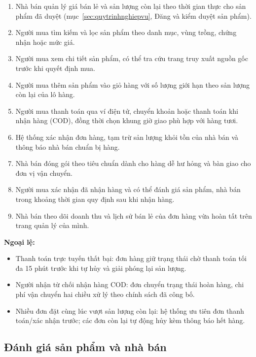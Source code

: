\begin{enumerate}
    \item Nhà bán quản lý giá bán lẻ và sản lượng còn lại theo thời gian thực cho sản phẩm đã duyệt (mục~\ref{sec:quytrinhnghiepvu}, Đăng và kiểm duyệt sản phẩm).
    \item Người mua tìm kiếm và lọc sản phẩm theo danh mục, vùng trồng, chứng nhận hoặc mức giá.
    \item Người mua xem chi tiết sản phẩm, có thể tra cứu trang truy xuất nguồn gốc trước khi quyết định mua.
    \item Người mua thêm sản phẩm vào giỏ hàng với số lượng giới hạn theo sản lượng còn lại của lô hàng.
    \item Người mua thanh toán qua ví điện tử, chuyển khoản hoặc thanh toán khi nhận hàng (COD), đồng thời chọn khung giờ giao phù hợp với hàng tươi.
    \item Hệ thống xác nhận đơn hàng, tạm trừ sản lượng khỏi tồn của nhà bán và thông báo nhà bán chuẩn bị hàng.
    \item Nhà bán đóng gói theo tiêu chuẩn dành cho hàng dễ hư hỏng và bàn giao cho đơn vị vận chuyển.
    \item Người mua xác nhận đã nhận hàng và có thể đánh giá sản phẩm, nhà bán trong khoảng thời gian quy định sau khi nhận hàng.
    \item Nhà bán theo dõi doanh thu và lịch sử bán lẻ của đơn hàng vừa hoàn tất trên trang quản lý của mình.
\end{enumerate}

\textbf{Ngoại lệ:}
\begin{itemize}
    \item Thanh toán trực tuyến thất bại: đơn hàng giữ trạng thái chờ thanh toán tối đa 15 phút trước khi tự hủy và giải phóng lại sản lượng.
    \item Người nhận từ chối nhận hàng COD: đơn chuyển trạng thái hoàn hàng, chi phí vận chuyển hai chiều xử lý theo chính sách đã công bố.
    \item Nhiều đơn đặt cùng lúc vượt sản lượng còn lại: hệ thống ưu tiên đơn thanh toán/xác nhận trước; các đơn còn lại tự động hủy kèm thông báo hết hàng.
\end{itemize}



\subsection{Đánh giá sản phẩm và nhà bán}
\label{subsec:danhgianghiepvu}

